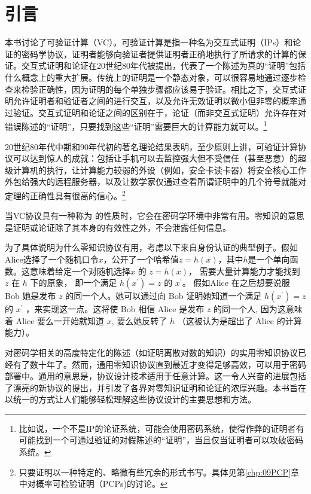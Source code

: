
\chapter{引言}\label{chp:01Introduction}


本书讨论了可验证计算（VC）。可验证计算是指一种名为交互式证明（IPs）和论证的密码学协议，证明者能够向验证者提供证明者正确地执行了所请求的计算的保证。交互式证明和论证在20世纪80年代被提出，代表了一个陈述为真的“证明”包括什么概念上的重大扩展。传统上的证明是一个静态对象，可以很容易地通过逐步检查来检验正确性，因为证明的每个单独步骤都应该易于验证。相比之下，交互式证明允许证明者和验证者之间的进行交互，以及允许无效证明以微小但非零的概率通过验证。交互式证明和论证之间的区别在于，论证（而非交互式证明）允许存在对错误陈述的“证明”，只要找到这些“证明”需要巨大的计算能力就可以。\footnote{比如说，一个不是IP的论证系统，可能会使用密码系统，使得作弊的证明者有可能找到一个可通过验证的对假陈述的“证明”，当且仅当证明者可以攻破密码系统。}

20世纪80年代中期和90年代初的著名理论结果表明，至少原则上讲，可验证计算协议可以达到惊人的成就：包括让手机可以去监控强大但不受信任（甚至恶意）的超级计算机的执行，让计算能力较弱的外设（例如，安全卡读卡器）将安全核心工作外包给强大的远程服务器，以及让数学家仅通过查看所谓证明中的几个符号就能对定理的正确性具有很高的信心。\footnote{只要证明以一种特定的、略微有些冗余的形式书写。具体见第\ref{chp:09PCP}章中对概率可检验证明（PCPs)的讨论。}


当VC协议具有一种称为 的性质时，它会在密码学环境中非常有用。零知识的意思是证明或论证除了其本身的有效性之外，不会泄露任何信息。

为了具体说明为什么零知识协议有用，考虑以下来自身份认证的典型例子。假如Alice选择了一个随机口令$x$，公开了一个哈希值$z=h(x)$，其中$h$是一个单向函数。这意味着给定一个对随机选择$x$ 的 $z=h(x)$， 需要大量计算能力才能找到 $z$ 在 $h$ 下的原象， 即一个满足 $h\left(x^{\prime}\right)=z$ 的 $x^{\prime}$。 假如Alice 在之后想要说服 Bob 她是发布 $z$ 的同一个人。她可以通过向 Bob 证明她知道一个满足 $h\left(x^{\prime}\right)=z$ 的 $x^{\prime}$ ，来实现这一点。这将使 Bob 相信 Alice 是发布 $z$ 的同一个人, 因为这意味着 Alice 要么一开始就知道 $x$, 要么她反转了 $h$ （这被认为是超出了 Alice 的计算能力）。



对密码学相关的高度特定化的陈述（如证明离散对数的知识\cite{Sch89}）的实用零知识协议已经有了数十年了。然而，通用零知识协议直到最近才变得足够高效，可以用于密码部署中。通用的意思是，协议设计技术适用于任意计算。这一令人兴奋的进展包括了漂亮的新协议的提出，并引发了各界对零知识证明和论证的浓厚兴趣。本书旨在以统一的方式让人们能够轻松理解这些协议设计的主要思想和方法。

